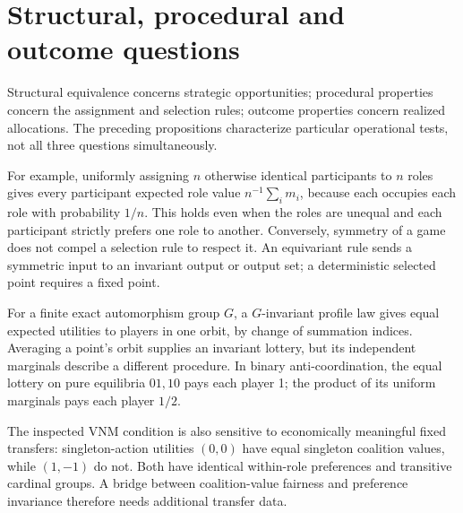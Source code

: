 \section{Structural, procedural and outcome questions}
Structural equivalence concerns strategic opportunities; procedural properties
concern the assignment and selection rules; outcome properties concern realized
allocations. The preceding propositions characterize particular operational
tests, not all three questions simultaneously.

For example, uniformly assigning $n$ otherwise identical participants to $n$
roles gives every participant expected role value $n^{-1}\sum_i m_i$, because
each occupies each role with probability $1/n$. This holds even when the roles
are unequal and each participant strictly prefers one role to another.
Conversely, symmetry of a game does not compel a selection rule to respect it.
An equivariant rule sends a symmetric input to an invariant output or output set;
a deterministic selected point requires a fixed point.

For a finite exact automorphism group $G$, a $G$-invariant profile law gives
equal expected utilities to players in one orbit, by change of summation
indices. Averaging a point's orbit supplies an invariant lottery, but its
independent marginals describe a different procedure. In binary
anti-coordination, the equal lottery on pure equilibria $01,10$ pays each
player 1; the product of its uniform marginals pays each player $1/2$.

The inspected VNM condition is also sensitive to economically meaningful
fixed transfers: singleton-action utilities $(0,0)$ have equal singleton
coalition values, while $(1,-1)$ do not. Both have identical within-role
preferences and transitive cardinal groups. A bridge between coalition-value
fairness and preference invariance therefore needs additional transfer data.
